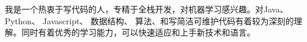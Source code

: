 

\begin{cvparagraph}

我是一个热衷于写代码的人，专精于全栈开发，对机器学习感兴趣。对Java、Python、 Javascript、 数据结构、 算法、和写简洁可维护代码有着较为深刻的理解。同时有着优秀的学习能力，可以快速适应和上手新技术和语言。
\end{cvparagraph}
